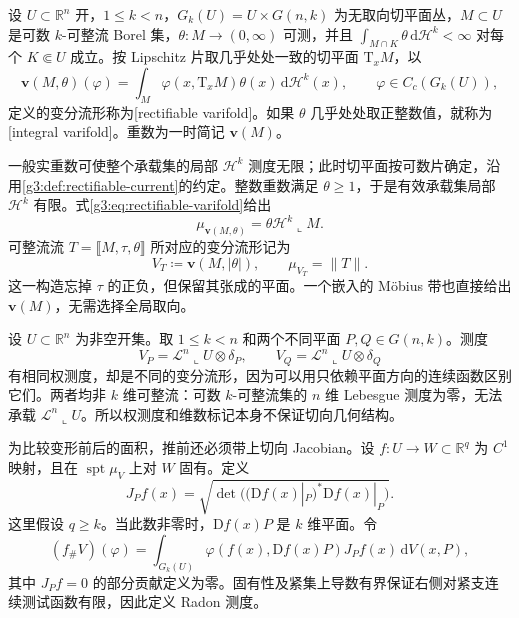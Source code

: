 \begin{definition}\label{g3:def:rectifiable-varifold}
	设 \(U\subset\mathbb R^n\) 开，\(1\le k<n\)，\(G_k(U)=U\times G(n,k)\) 为无取向切平面丛，\(M\subset U\) 是可数 \(k\)-可整流 Borel 集，\(\theta:M\to(0,\infty)\) 可测，并且 \(\int_{M\cap K}\theta\,\mathrm d\mathcal H^k<\infty\) 对每个 \(K\Subset U\) 成立。按 Lipschitz 片取几乎处处一致的切平面 \(\mathrm{T}_xM\)，以
	\begin{equation}\label{g3:eq:rectifiable-varifold}
		\mathbf v(M,\theta)(\varphi)
		=\int_M\varphi(x,\mathrm{T}_xM)\theta(x)\,\mathrm d\mathcal H^k(x),
		\qquad \varphi\in C_c(G_k(U)),
	\end{equation}
	定义的变分流形称为[rectifiable varifold]。如果 \(\theta\) 几乎处处取正整数值，就称为[integral varifold]。重数为一时简记 \(\mathbf v(M)\)。
\end{definition}

一般实重数可使整个承载集的局部 \(\mathcal H^k\) 测度无限；此时切平面按可数片确定，沿用\cref{g3:def:rectifiable-current}的约定。整数重数满足 \(\theta\ge1\)，于是有效承载集局部 \(\mathcal H^k\) 有限。式\eqref{g3:eq:rectifiable-varifold}给出
\[
	\mu_{\mathbf v(M,\theta)}=\theta\mathcal H^k\llcorner M.
\]
可整流流 \(T=\lBrack M,\tau,\theta\rBrack\) 所对应的变分流形记为
\begin{equation}\label{g3:eq:current-associated-varifold}
	V_T\coloneqq\mathbf v(M,|\theta|),\qquad \mu_{V_T}=\|T\|.
\end{equation}
这一构造忘掉 \(\tau\) 的正负，但保留其张成的平面。一个嵌入的 Möbius 带也直接给出 \(\mathbf v(M)\)，无需选择全局取向。

\begin{example}\label{g3:exm:diffuse-varifold}
	设 \(U\subset\mathbb R^n\) 为非空开集。取 \(1\le k<n\) 和两个不同平面 \(P,Q\in G(n,k)\)。测度
	\[
		V_P=\mathcal L^n\llcorner U\otimes\delta_P,\qquad
		V_Q=\mathcal L^n\llcorner U\otimes\delta_Q
	\]
	有相同权测度，却是不同的变分流形，因为可以用只依赖平面方向的连续函数区别它们。两者均非 \(k\) 维可整流：可数 \(k\)-可整流集的 \(n\) 维 Lebesgue 测度为零，无法承载 \(\mathcal L^n\llcorner U\)。所以权测度和维数标记本身不保证切向几何结构。
\end{example}

为比较变形前后的面积，推前还必须带上切向 Jacobian。设 \(f:U\to W\subset\mathbb R^q\) 为 \(C^1\) 映射，且在 \(\operatorname{spt}\mu_V\) 上对 \(W\) 固有。定义
\[
	J_Pf(x)=\sqrt{\det\bigl((\mathrm Df(x)|_P)^*\mathrm Df(x)|_P\bigr)}.
\]
这里假设 \(q\ge k\)。当此数非零时，\(\mathrm Df(x)P\) 是 \(k\) 维平面。令
\begin{equation}\label{g3:eq:varifold-pushforward}
	(f_\#V)(\varphi)=\int_{G_k(U)}
	\varphi(f(x),\mathrm Df(x)P)J_Pf(x)\,\mathrm dV(x,P),
\end{equation}
其中 \(J_Pf=0\) 的部分贡献定义为零。固有性及紧集上导数有界保证右侧对紧支连续测试函数有限，因此定义 Radon 测度。

